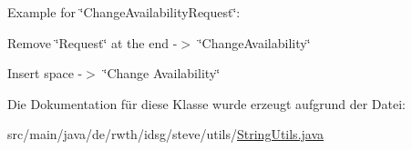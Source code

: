 Example for \char`\"{}\-Change\-Availability\-Request\char`\"{}\-:
\begin{DoxyItemize}
\item Remove \char`\"{}\-Request\char`\"{} at the end -\/$>$ \char`\"{}\-Change\-Availability\char`\"{}
\item Insert space -\/$>$ \char`\"{}\-Change Availability\char`\"{} 
\end{DoxyItemize}

Die Dokumentation für diese Klasse wurde erzeugt aufgrund der Datei\-:\begin{DoxyCompactItemize}
\item 
src/main/java/de/rwth/idsg/steve/utils/\hyperlink{_string_utils_8java}{String\-Utils.\-java}\end{DoxyCompactItemize}
